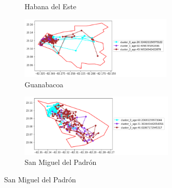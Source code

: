 \begin{figure}[h!]
\begin{subfigure}[b]{0.49\linewidth}
		\caption{Habana del Este}
		\label{fig:HabEste}
	\end{subfigure}
	\begin{subfigure}[b]{0.49\linewidth}
		\includegraphics[width=\linewidth, height=3cm]{Images/Guanabacoa.png}
		\caption{Guanabacoa}
		\label{fig:Guanabacoa}
	\end{subfigure}
	\begin{subfigure}[b]{0.49\linewidth}
		\includegraphics[width=\linewidth, height=3cm]{Images/SanMiguel.png}
		\caption{San Miguel del Padrón}
		\label{fig:SanMiguel}
	\end{subfigure}
	
	
	
	\label{fig:Resto de los municipios}
\end{figure}
